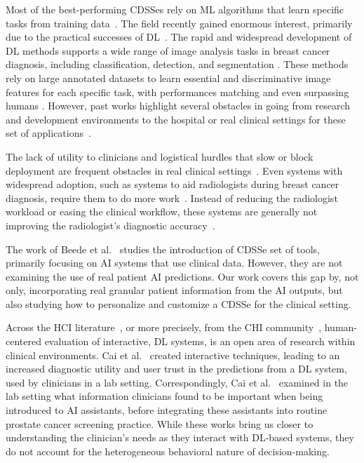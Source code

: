 Most of the best-performing \acp{CDSSe} rely on \ac{ML} algorithms that learn specific tasks from training data~\cite{10.1001/jama.2018.17163, Zaman49, 10.1145/3399715.3399744}.
The field recently gained enormous interest, primarily due to the practical successes of \ac{DL}~\cite{10.1007/978-3-030-22871-2_67}.
The rapid and widespread development of \ac{DL} methods supports a wide range of image analysis tasks in breast cancer diagnosis, including classification, detection, and segmentation \cite{lecun2015deep, DIN2022106073}.
These methods rely on large annotated datasets to learn essential and discriminative image features for each specific task, with performances matching and even surpassing humans \cite{esteva2017dermatologist}.
However, past works highlight several obstacles in going from research and development environments to the hospital or real clinical settings for these set of applications~\cite{https://doi.org/10.3322/caac.21552, 10.1145/3313831.3376718}.

The lack of utility to clinicians and logistical hurdles that slow or block deployment are frequent obstacles in real clinical settings~\cite{Elwyn2013, Musen2021}.
Even systems with widespread adoption, such as systems to aid radiologists during breast cancer diagnosis, require them to do more work~\cite{KOHLI2018535}.
Instead of reducing the radiologist workload or easing the clinical workflow, these systems are generally not improving the radiologist's diagnostic accuracy~\cite{Cole2014fi, KOHLI2018535}.

The work of Beede et al.~\cite{10.1145/3313831.3376718} studies the introduction of \ac{CDSSe} set of tools, primarily focusing on \ac{AI} systems that use clinical data.
However, they are not examining the use of real patient \ac{AI} predictions.
Our work covers this gap by, not only, incorporating real granular patient information from the \ac{AI} outputs, but also studying how to personalize and customize a \ac{CDSSe} for the clinical setting.

Across the \ac{HCI} literature~\cite{10.1145/3311957.3359433, 10.1145/3359206, Fitzpatrick2013, 10.1145/3538882.3542790}, or more precisely, from the \acs{CHI} community~\cite{10.1145/3313831.3376718, 10.1145/3290605.3300234}, human-centered evaluation of interactive, \ac{DL} systems, is an open area of research within clinical environments.
Cai et al.~\cite{10.1145/3290605.3300234} created interactive techniques, leading to an increased diagnostic utility and user trust in the predictions from a \ac{DL} system, used by clinicians in a lab setting.
Correspondingly, Cai et al.~\cite{10.1145/3359206} examined in the lab setting what information clinicians found to be important when being introduced to \ac{AI} assistants, before integrating these assistants into routine prostate cancer screening practice.
While these works bring us closer to understanding the clinician's needs as they interact with \ac{DL}-based systems, they do not account for the heterogeneous behavioral nature of decision-making.

